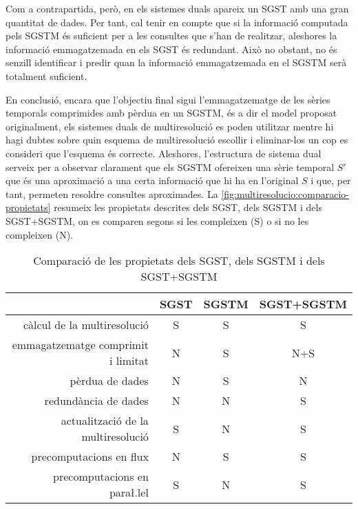 Com a contrapartida, però, en els sistemes duals apareix un \gls{SGST}
amb una gran quantitat de dades. Per tant, cal tenir en compte que si
la informació computada pels \gls{SGSTM} és suficient per a les
consultes que s'han de realitzar, aleshores la informació
emmagatzemada en els \gls{SGST} és redundant. Això no obstant, no és
senzill identificar i predir quan la informació emmagatzemada en el
\gls{SGSTM} serà totalment suficient.



En conclusió, encara que l'objectiu final sigui l'emmagatzematge de
les sèries temporals comprimides amb pèrdua en un \gls{SGSTM}, és a
dir el model proposat originalment, els sistemes duals de
multiresolució es poden utilitzar mentre hi hagi dubtes sobre quin
esquema de multiresolució escollir i eliminar-los un cop es consideri
que l'esquema és correcte. Aleshores, l'estructura de sistema dual
serveix per a observar clarament que els \gls{SGSTM} ofereixen una
sèrie temporal $S'$ que és una aproximació a una certa informació que
hi ha en l'original $S$ i que, per tant, permeten resoldre consultes
aproximades.%
La \autoref{fig:multiresolucio:comparacio-propietats} resumeix les
propietats descrites dels \gls{SGST}, dels \gls{SGSTM} i dels
\gls{SGST}+\gls{SGSTM}, on es comparen segons si les compleixen (S) o
si no les compleixen (N).


\begin{table}[tp]
  \centering
  \begin{tabular}[c]{r|ccc}
  & \gls{SGST} & \gls{SGSTM} & \gls{SGST}+\gls{SGSTM}\\\hline
  càlcul de la multiresolució & S & S & S \\
  emmagatzematge comprimit i limitat & N & S & N+S\\
  pèrdua de dades & N & S & N\\
  redundància de dades & N & N & S\\ 
  actualització de la multiresolució & S & N & S\\
  precomputacions en flux & N & S & S\\
  precomputacions en para\l.lel & S & N & S\\
\end{tabular}
  \caption{Comparació de les propietats dels \gls{SGST}, dels \gls{SGSTM} i dels \gls{SGST}+\gls{SGSTM}}
  \label{fig:multiresolucio:comparacio-propietats}
\end{table}

















